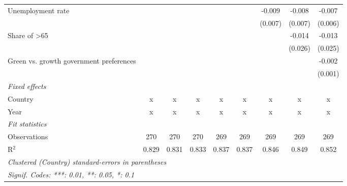 \begin{table}[htbp]
\begin{tabular}{lcccccccc}
      Unemployment rate                       &         &         &             &              &             & -0.009       & -0.008       & -0.007\\   
                                              &         &         &             &              &             & (0.007)      & (0.007)      & (0.006)\\   
      Share of >65                            &         &         &             &              &             &              & -0.014       & -0.013\\   
                                              &         &         &             &              &             &              & (0.026)      & (0.025)\\   
      Green vs. growth government preferences &         &         &             &              &             &              &              & -0.002\\   
                                              &         &         &             &              &             &              &              & (0.001)\\   
      \emph{Fixed effects}\\
      Country                                 & x       & x       & x           & x            & x           & x            & x            & x\\  
      Year                                    & x       & x       & x           & x            & x           & x            & x            & x\\  
      \midrule \emph{Fit statistics}\\
      Observations                            & 270     & 270     & 270         & 269          & 269         & 269          & 269          & 269\\  
      R$^2$                                   & 0.829   & 0.831   & 0.833       & 0.837        & 0.837       & 0.846        & 0.849        & 0.852\\  
      \midrule
      \multicolumn{9}{l}{\emph{Clustered (Country) standard-errors in parentheses}}\\
      \multicolumn{9}{l}{\emph{Signif. Codes: ***: 0.01, **: 0.05, *: 0.1}}\\
   \end{tabular}
\end{table}



